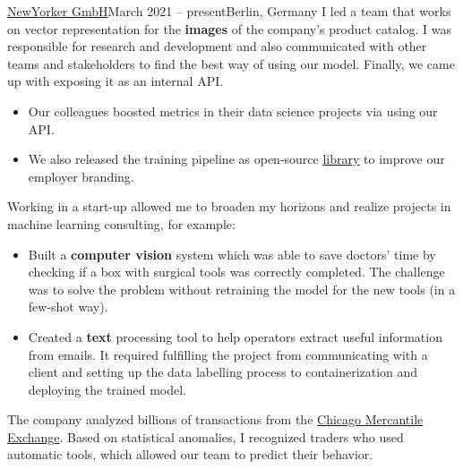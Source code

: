 
{\href{https://www.newyorker.de/}{NewYorker GmbH}}{March 2021 -- present}{Berlin, Germany}
I led a team that works on vector representation for the \textbf{images} of the company's product catalog.
I was responsible for research and development and also
communicated with other teams and stakeholders to find the best way of using our model.
Finally, we came up with exposing it as an internal API. 
\begin{itemize}
\item Our colleagues boosted metrics in their data science projects via using our API. 
\item We also released the training pipeline as open-source \href{https://github.com/OML-Team/open-metric-learning}{\underline{library}} to improve our employer branding. 
\end{itemize}

\divider

Working in a start-up allowed me to broaden my horizons and realize projects in machine learning consulting, for example:
\begin{itemize}
\item Built a \textbf{computer vision} system which was able to save doctors' time by checking if a box with surgical tools was correctly completed. The challenge was to solve the problem without retraining the model for the new tools (in a few-shot way).
\item Created a \textbf{text} processing tool to help operators extract useful information from emails. It required fulfilling the project from communicating with a client and setting up the data labelling process to containerization and deploying the trained model.
\end{itemize}

\divider

The company analyzed billions of transactions from the \href{https://en.wikipedia.org/wiki/Chicago_Mercantile_Exchange}
{Chicago Mercantile Exchange}.
Based on statistical anomalies, I recognized traders who used automatic tools, which allowed our team to predict their behavior.
\smallskip
\smallskip
